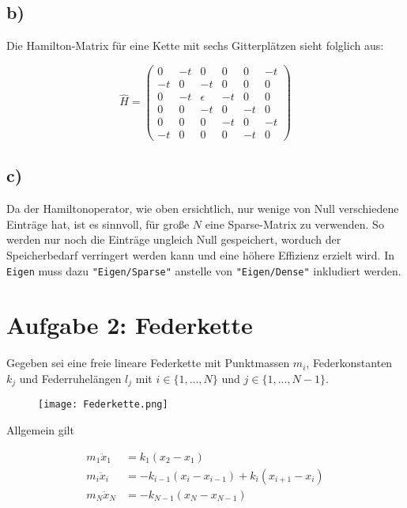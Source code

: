 \subsection*{b)}
Die Hamilton-Matrix für eine Kette mit sechs Gitterplätzen sieht folglich aus:

\begin{equation*}
  \hat{H}=
\begin{pmatrix}
	0  & -t & 0			 & 0  & 0  & -t \\
	-t & 0  & -t	     & 0  & 0  &  0 \\
	0  & -t & \epsilon  & -t & 0  &  0 \\
	0  & 0  & -t		 & 0  & -t &  0 \\
	0  & 0  & 0			 & -t & 0  &  -t \\
	-t & 0  & 0			 & 0  & -t &  0
\end{pmatrix}
\end{equation*}

\subsection*{c)}
Da der Hamiltonoperator, wie oben ersichtlich, nur wenige von Null verschiedene Einträge hat, ist es sinnvoll, für große $N$ eine Sparse-Matrix zu verwenden.
So werden nur noch die Einträge ungleich Null gespeichert, worduch der Speicherbedarf verringert werden kann und eine höhere Effizienz erzielt wird.
In \texttt{Eigen} muss dazu \texttt{"Eigen/Sparse"} anstelle von \texttt{"Eigen/Dense"} inkludiert werden.


\section*{Aufgabe 2: Federkette}
Gegeben sei eine freie lineare Federkette mit Punktmassen $m_i$, Federkonstanten $k_j$ und Federruhelängen $l_j$ mit $i \in \{1, ..., N\}$ und $j \in \{1, ..., N-1\}$.
\begin{figure}[h]
    \centering
    \texttt{[image: Federkette.png]}
    \label{fig:1a}
\end{figure}

\noindent
Allgemein gilt

\begin{align*}
  m_1\ddot{x}_1 &= k_1(x_2 - x_1) \\
  m_i\ddot{x}_i &= -k_{i-1} (x_i - x_{i-1}) + k_i(x_{i+1}-x_i) \\
  m_N\ddot{x}_N &= -k_{N-1}(x_N - x_{N-1}) \\
\end{align*}

